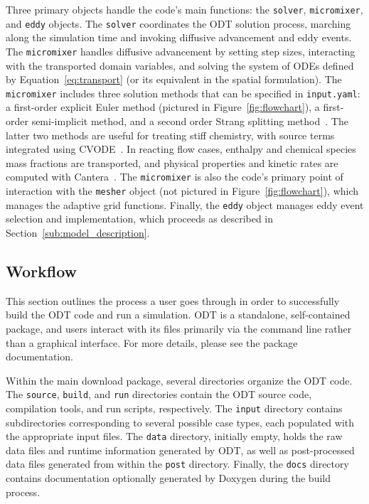 \documentclass[preprint,12pt, a4paper]{elsarticle}
\begin{document}
Three primary objects handle the code's main functions: the \texttt{solver}, \texttt{micromixer}, and \texttt{eddy} objects. The \texttt{solver} coordinates the ODT solution process, marching along the simulation time and invoking diffusive advancement and eddy events. The \texttt{micromixer} handles diffusive advancement by setting step sizes, interacting with the transported domain variables, and solving the system of ODEs defined by Equation~\ref{eq:transport} (or its equivalent in the spatial formulation). The \texttt{micromixer} includes three solution methods that can be specified in \texttt{input.yaml}: a first-order explicit Euler method (pictured in Figure~\ref{fig:flowchart}), a first-order semi-implicit method, and a second order Strang splitting method~\cite{Strang_1968}. The latter two methods are useful for treating stiff chemistry, with source terms integrated using CVODE~\cite{Hindmarsh_2020}. In reacting flow cases, enthalpy and chemical species mass fractions are transported, and physical properties and kinetic rates are computed with Cantera~\cite{Goodwin_2018}. The \texttt{micromixer} is also the code's primary point of interaction with the \texttt{mesher} object (not pictured in Figure~\ref{fig:flowchart}), which manages the adaptive grid functions. Finally, the \texttt{eddy} object manages eddy event selection and implementation, which proceeds as described in Section~\ref{sub:model_description}.  

\subsection{Workflow}
\label{sub:workflow}

This section outlines the process a user goes through in order to successfully build the ODT code and run a simulation. ODT is a standalone, self-contained package, and users interact with its files primarily via the command line rather than a graphical interface. For more details, please see the package documentation.

Within the main download package, several directories organize the ODT code. The \texttt{source}, \texttt{build}, and \texttt{run} directories contain the ODT source code, compilation tools, and run scripts, respectively. The \texttt{input} directory contains subdirectories corresponding to several possible case types, each populated with the appropriate input files. The \texttt{data} directory, initially empty, holds the raw data files and runtime information generated by ODT, as well as post-processed data files generated from within the \texttt{post} directory. Finally, the \texttt{docs} directory contains documentation optionally generated by Doxygen \cite{vanHeesch_2018} during the build process. 
\end{document}
